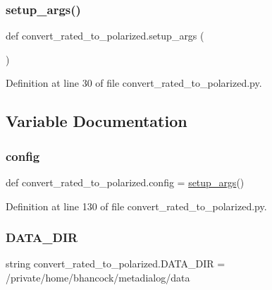 \subsubsection{\texorpdfstring{setup\+\_\+args()}{setup\_args()}}
{\footnotesize\ttfamily def convert\+\_\+rated\+\_\+to\+\_\+polarized.\+setup\+\_\+args (\begin{DoxyParamCaption}{ }\end{DoxyParamCaption})}



Definition at line 30 of file convert\+\_\+rated\+\_\+to\+\_\+polarized.\+py.



\subsection{Variable Documentation}
\mbox{\label{namespaceconvert__rated__to__polarized_a9f2a838640dc3f5e42dcceb38c328970}} 
\subsubsection{\texorpdfstring{config}{config}}
{\footnotesize\ttfamily def convert\+\_\+rated\+\_\+to\+\_\+polarized.\+config = \hyperlink{namespaceconvert__rated__to__polarized_a8bc22c281ecfa0599048982d56f71437}{setup\+\_\+args}()}



Definition at line 130 of file convert\+\_\+rated\+\_\+to\+\_\+polarized.\+py.

\mbox{\label{namespaceconvert__rated__to__polarized_af06b8478fd92517a148a9851d1dd86c3}} 
\subsubsection{\texorpdfstring{D\+A\+T\+A\+\_\+\+D\+IR}{DATA\_DIR}}
{\footnotesize\ttfamily string convert\+\_\+rated\+\_\+to\+\_\+polarized.\+D\+A\+T\+A\+\_\+\+D\+IR = \textquotesingle{}/private/home/bhancock/metadialog/data\textquotesingle{}}



